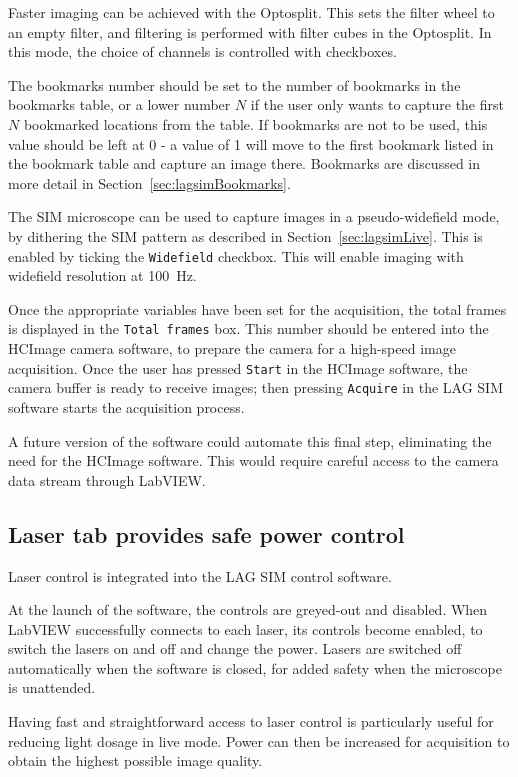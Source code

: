 Faster imaging can be achieved with the Optosplit. 
This sets the filter wheel to an empty filter, and filtering is performed with filter cubes in the Optosplit. 
In this mode, the choice of channels is controlled with checkboxes. 

The bookmarks number should be set to the number of bookmarks in the bookmarks table, or a lower number $N$ if the user only wants to capture the first $N$ bookmarked locations from the table. 
If bookmarks are not to be used, this value should be left at 0 - a value of 1 will move to the first bookmark listed in the bookmark table and capture an image there. 
Bookmarks are discussed in more detail in Section~\ref{sec:lagsimBookmarks}. 

The SIM microscope can be used to capture images in a pseudo-widefield mode, by dithering the SIM pattern as described in Section~\ref{sec:lagsimLive}. 
This is enabled by ticking the \texttt{Widefield} checkbox. 
This will enable imaging with widefield resolution at \SI{100}{\hertz}. 

Once the appropriate variables have been set for the acquisition, the total frames is displayed in the \texttt{Total frames} box. 
This number should be entered into the HCImage camera software, to prepare the camera for a high-speed image acquisition. 
Once the user has pressed \texttt{Start} in the HCImage software, the camera buffer is ready to receive images; then pressing \texttt{Acquire} in the LAG SIM software starts the acquisition process. 

A future version of the software could automate this final step, eliminating the need for the HCImage software.
This would require careful access to the camera data stream through LabVIEW. 


\subsection{Laser tab provides safe power control}
Laser control is integrated into the LAG SIM control software. 

At the launch of the software, the controls are greyed-out and disabled. 
When LabVIEW successfully connects to each laser, its controls become enabled, to switch the lasers on and off and change the power. 
Lasers are switched off automatically when the software is closed, for added safety when the microscope is unattended. 

Having fast and straightforward access to laser control is particularly useful for reducing light dosage in live mode.
Power can then be increased for acquisition to obtain the highest possible image quality. 

